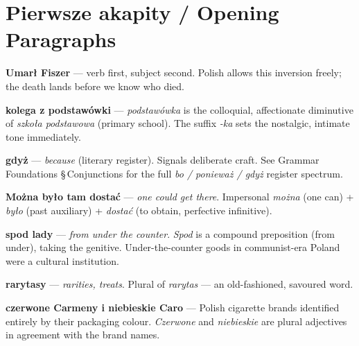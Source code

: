 \section{Pierwsze akapity / Opening Paragraphs}


\textbf{Umarł Fiszer} — verb first, subject second. Polish allows this inversion 
freely; the death lands before we know who died.

\textbf{kolega z podstawówki} — \textit{podstawówka} is the colloquial, affectionate 
diminutive of \textit{szkoła podstawowa} (primary school). The suffix \textit{-ka} 
sets the nostalgic, intimate tone immediately.

\textbf{gdyż} — \textit{because} (literary register). Signals deliberate craft. 
See Grammar Foundations §\,Conjunctions for the full \textit{bo / ponieważ / gdyż} 
register spectrum.

\textbf{Można było tam dostać} — \textit{one could get there}. Impersonal 
\textit{można} (one can) + \textit{było} (past auxiliary) + 
\textit{dostać} (to obtain, perfective infinitive).

\textbf{spod lady} — \textit{from under the counter}. \textit{Spod} is a 
compound preposition (from under), taking the genitive. Under-the-counter goods 
in communist-era Poland were a cultural institution.

\textbf{rarytasy} — \textit{rarities, treats}. Plural of \textit{rarytas} — 
an old-fashioned, savoured word.

\textbf{czerwone Carmeny i niebieskie Caro} — Polish cigarette brands identified 
entirely by their packaging colour. \textit{Czerwone} and \textit{niebieskie} are 
plural adjectives in agreement with the brand names.


